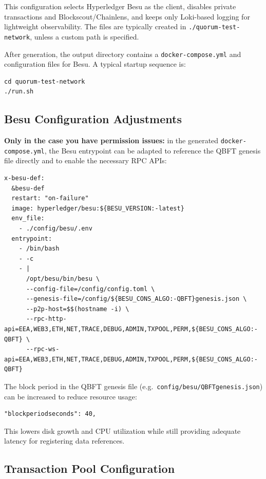 \documentclass[11pt,a4paper]{article}
\begin{document}
This configuration selects Hyperledger Besu as the client, disables private transactions and Blockscout/Chainlens, and keeps only Loki-based logging for lightweight observability. The files are typically created in \texttt{./quorum-test-network}, unless a custom path is specified.

After generation, the output directory contains a \texttt{docker-compose.yml} and configuration files for Besu. A typical startup sequence is:

\begin{lstlisting}
cd quorum-test-network
./run.sh
\end{lstlisting}

\subsection{Besu Configuration Adjustments}

\textbf{Only in the case you have permission issues:} in the generated \texttt{docker-compose.yml}, the Besu entrypoint can be adapted to reference the QBFT genesis file directly and to enable the necessary RPC APIs:

\begin{lstlisting}
x-besu-def:
  &besu-def
  restart: "on-failure"
  image: hyperledger/besu:${BESU_VERSION:-latest}
  env_file:
    - ./config/besu/.env
  entrypoint:
    - /bin/bash
    - -c
    - |
      /opt/besu/bin/besu \
      --config-file=/config/config.toml \
      --genesis-file=/config/${BESU_CONS_ALGO:-QBFT}genesis.json \
      --p2p-host=$$(hostname -i) \
      --rpc-http-api=EEA,WEB3,ETH,NET,TRACE,DEBUG,ADMIN,TXPOOL,PERM,${BESU_CONS_ALGO:-QBFT} \
      --rpc-ws-api=EEA,WEB3,ETH,NET,TRACE,DEBUG,ADMIN,TXPOOL,PERM,${BESU_CONS_ALGO:-QBFT}
\end{lstlisting}

The block period in the QBFT genesis file (e.g.\ \texttt{config/besu/QBFTgenesis.json}) can be increased to reduce resource usage:

\begin{lstlisting}
"blockperiodseconds": 40,
\end{lstlisting}

This lowers disk growth and CPU utilization while still providing adequate latency for registering data references.

\subsection{Transaction Pool Configuration}
\end{document}
